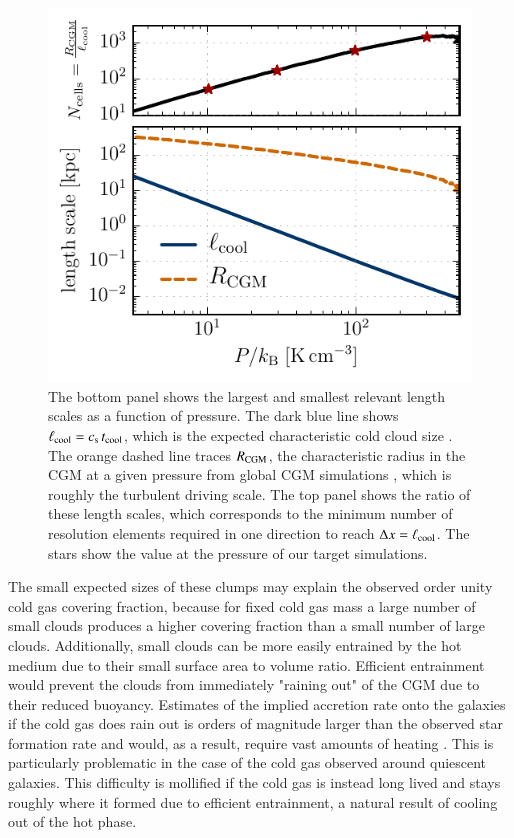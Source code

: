 \documentclass[11pt,letterpaper,english]{article}
\begin{document}
\begin{figure}[ht]
    \centering
    \begin{minipage}{0.425\textwidth}
	\caption{ The bottom panel shows the largest and smallest relevant length scales as a function of pressure. The dark blue line shows $\ell_{\rm cool} = c_{\rm s} \, t_{\rm cool}$, which is the expected characteristic cold cloud size \cite{McCourt18}. The orange dashed line traces $R_{\rm CGM}$, the characteristic radius in the CGM at a given pressure from global CGM simulations \cite{Fielding17}, which is roughly the turbulent driving scale. The top panel shows the ratio of these length scales, which corresponds to the minimum number of resolution elements required in one direction to reach $\Delta x = \ell_{\rm cool}$. The stars show the value at the pressure of our target simulations. \label{fig:cs_tcool}}
    \end{minipage}\hfill
    \begin{minipage}{0.575\textwidth}
        \includegraphics[width=\textwidth]{length_scales_sim.pdf} 
    \end{minipage}
\end{figure}

The small expected sizes of these clumps may explain the observed order unity cold gas covering fraction, because for fixed cold gas mass a large number of small clouds produces a higher covering fraction than a small number of large clouds. Additionally, small clouds can be more easily entrained by the hot medium due to their small surface area to volume ratio. Efficient entrainment would prevent the clouds from immediately "raining out" of the CGM due to their reduced buoyancy. Estimates of the implied accretion rate onto the galaxies if the cold gas does rain out is orders of magnitude larger than the observed star formation rate and would, as a result, require vast amounts of heating \cite{McQuinnWerk}. This is particularly problematic in the case of the cold gas observed around quiescent galaxies. This difficulty is mollified if the cold gas is instead long lived and stays roughly where it formed due to efficient entrainment, a natural result of cooling out of the hot phase.
\end{document}

